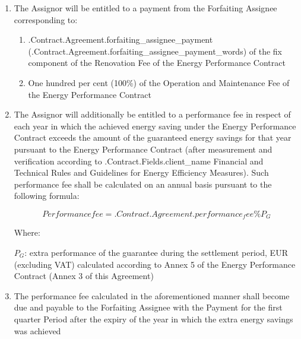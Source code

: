 \documentclass[a4paper]{article}
\begin{document}
\begin{enumerate}
\item{The Assignor will be entitled to a payment from the Forfaiting
    Assignee corresponding to:}

  \begin{enumerate}
  \item{ \iffalse input forfaitingFields.forfaiting_assignee_payment value="{{.Contract.Agreement.forfaiting_assignee_payment}}" type="number" \fi {{.Contract.Agreement.forfaiting_assignee_payment}} (\iffalse input forfaitingFields.forfaiting_assignee_payment_words value="{{.Contract.Agreement.forfaiting_assignee_payment_words}}" type="number" \fi {{.Contract.Agreement.forfaiting_assignee_payment_words}}) of the fix component of the Renovation
      Fee of the Energy Performance Contract}

  \item{One hundred per cent (100\%) of the Operation and Maintenance
      Fee of the Energy Performance Contract}
  \end{enumerate}

\item{The Assignor will additionally be entitled to a performance fee
    in respect of each year in which the achieved energy saving under
    the Energy Performance Contract exceeds the amount of the
    guaranteed energy savings for that year pursuant to the Energy
    Performance Contract (after measurement and verification according
    to {{.Contract.Fields.client_name}} Financial and Technical Rules and Guidelines for Energy
    Efficiency Measures). Such performance fee shall be calculated on
    an annual basis pursuant to the following formula: \par

    \begin{center}
      \[Performance fee = \iffalse input forfaitingFields.performance_fee value="{{.Contract.Agreement.performance_fee}}" type="number" \fi {{.Contract.Agreement.performance_fee}}\% P_G\]
    \end{center}

    Where: \par
    $P_G$: extra performance of the guarantee during the
    settlement period, EUR (excluding VAT) calculated according to
    Annex 5 of the Energy Performance Contract (Annex 3 of this
    Agreement)}

\item{The performance fee calculated in the aforementioned manner
    shall become due and payable to the Forfaiting Assignee with the
    Payment for the first quarter Period after the expiry of the year
    in which the extra energy savings was achieved}


\end{enumerate}
\end{document}
